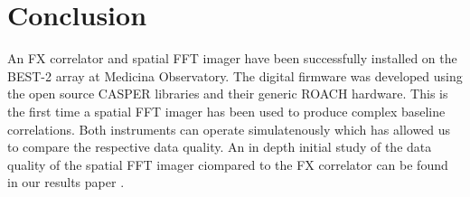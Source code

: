 \documentclass[useAMS,macros,usenatbib]{mn2e}
\begin{document}
%
%

\section{Conclusion}
\label{conclusion}

An FX correlator and spatial FFT imager have been successfully installed on the BEST-2 array at Medicina Observatory.
The digital firmware was developed using the open source CASPER libraries and their generic ROACH hardware.
This is the first time a spatial FFT imager has been used to produce complex baseline correlations.
Both instruments can operate simulatenously which has allowed us to compare the respective data quality.
An in depth initial study of the data quality of the spatial FFT imager ciompared to the FX correlator can be found in our results paper \citep{med_science}.
\end{document}
